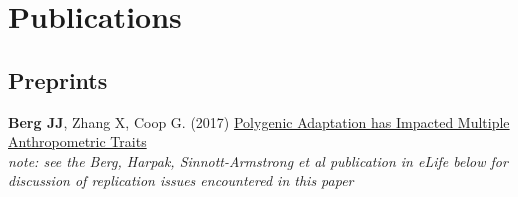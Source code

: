 \documentclass[letterpaper]{article}
\renewenvironment{itemize}{
  \begin{list}{}{
    \setlength{\leftmargin}{1.5em}
  }
}{
  \end{list}
}
\begin{document}

\section*{Publications}
\subsection*{Preprints}
\begin{itemize}
%
%
%
\item \textbf{Berg JJ}, Zhang X, Coop G. (2017) \href{https://doi.org/10.1101/167551}{Polygenic Adaptation has Impacted Multiple Anthropometric Traits}\\
  \textit{note: see the Berg, Harpak, Sinnott-Armstrong et al publication in eLife below for discussion of replication issues encountered in this paper}

\end{itemize}
\end{document}

